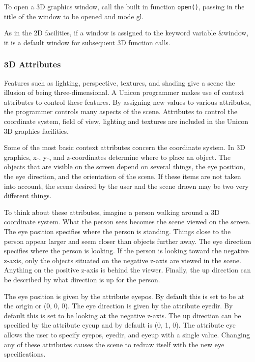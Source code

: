 To open a 3D graphics window, call the built in function \texttt{open()},
passing in the title of the window to be opened and mode
{\textquotedbl}gl{\textquotedbl}.


As in the 2D facilities, if a window is assigned to the keyword variable
\&window, it is a default window for subsequent 3D function calls. 

\subsubsection{3D Attributes}

Features such as lighting, perspective, textures, and shading give a
scene the illusion of being three-dimensional. A Unicon programmer makes
use of context attributes to control these features. By
assigning new values to various attributes, the programmer controls
many aspects of the scene. Attributes to control the coordinate system,
field of view, lighting and textures are included in the Unicon 3D
graphics facilities. 

Some of the most basic context attributes concern the coordinate system.
In 3D graphics, x-, y-, and z-coordinates
determine where to place an object. The objects that are visible on the
screen depend on several things, the eye position, the eye direction,
and the orientation of the scene. If these items are not taken into
account, the scene desired by the user and the scene drawn may be two
very different things. 

To think about these attributes, imagine a person walking around a 3D
coordinate system. What the person sees becomes the scene viewed on the
screen. The eye position specifies where the person is standing. Things
close to the person appear larger and seem closer than objects further
away. The eye direction specifies where the person is looking. If the
person is looking toward the negative z-axis, only the objects situated
on the negative z-axis are viewed in the scene. Anything on the
positive z-axis is behind the viewer. Finally, the up direction can be
described by what direction is up for the person. 

The eye position is given by the attribute eyepos. By default this is
set to be at the origin or (0, 0, 0). The eye direction is given by the
attribute eyedir. By default this is set to be looking at the negative
z-axis. The up direction can be specified by the attribute eyeup and by
default is (0, 1, 0). The attribute eye allows the user to specify
eyepos, eyedir, and eyeup with a single value. Changing any of these
attributes causes the scene to redraw itself with the new eye
specifications.

